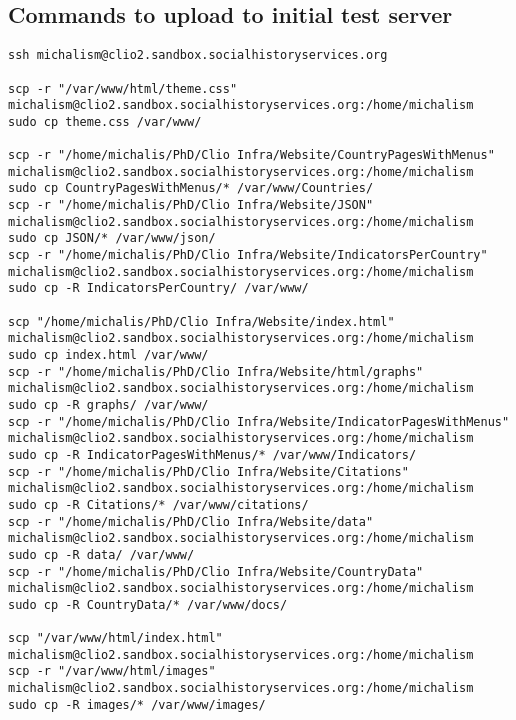 \documentclass[a4paper]{article}
\begin{document}
\subsection{Commands to upload to initial test server}
\begin{verbatim}
ssh michalism@clio2.sandbox.socialhistoryservices.org

scp -r "/var/www/html/theme.css" 
michalism@clio2.sandbox.socialhistoryservices.org:/home/michalism
sudo cp theme.css /var/www/

scp -r "/home/michalis/PhD/Clio Infra/Website/CountryPagesWithMenus" 
michalism@clio2.sandbox.socialhistoryservices.org:/home/michalism
sudo cp CountryPagesWithMenus/* /var/www/Countries/
scp -r "/home/michalis/PhD/Clio Infra/Website/JSON" 
michalism@clio2.sandbox.socialhistoryservices.org:/home/michalism
sudo cp JSON/* /var/www/json/
scp -r "/home/michalis/PhD/Clio Infra/Website/IndicatorsPerCountry" 
michalism@clio2.sandbox.socialhistoryservices.org:/home/michalism
sudo cp -R IndicatorsPerCountry/ /var/www/

scp "/home/michalis/PhD/Clio Infra/Website/index.html" 
michalism@clio2.sandbox.socialhistoryservices.org:/home/michalism
sudo cp index.html /var/www/
scp -r "/home/michalis/PhD/Clio Infra/Website/html/graphs" 
michalism@clio2.sandbox.socialhistoryservices.org:/home/michalism
sudo cp -R graphs/ /var/www/
scp -r "/home/michalis/PhD/Clio Infra/Website/IndicatorPagesWithMenus" 
michalism@clio2.sandbox.socialhistoryservices.org:/home/michalism
sudo cp -R IndicatorPagesWithMenus/* /var/www/Indicators/
scp -r "/home/michalis/PhD/Clio Infra/Website/Citations" 
michalism@clio2.sandbox.socialhistoryservices.org:/home/michalism
sudo cp -R Citations/* /var/www/citations/
scp -r "/home/michalis/PhD/Clio Infra/Website/data" 
michalism@clio2.sandbox.socialhistoryservices.org:/home/michalism
sudo cp -R data/ /var/www/
scp -r "/home/michalis/PhD/Clio Infra/Website/CountryData" 
michalism@clio2.sandbox.socialhistoryservices.org:/home/michalism
sudo cp -R CountryData/* /var/www/docs/

scp "/var/www/html/index.html" 
michalism@clio2.sandbox.socialhistoryservices.org:/home/michalism
scp -r "/var/www/html/images" 
michalism@clio2.sandbox.socialhistoryservices.org:/home/michalism
sudo cp -R images/* /var/www/images/
\end{verbatim}

\end{document}

